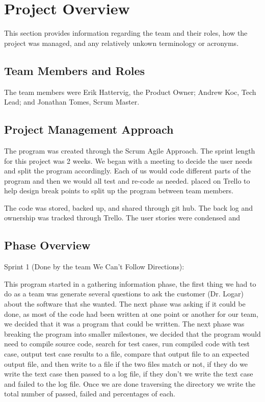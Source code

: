 

\chapter{Project Overview}
This section provides information regarding the team and their roles,
how the project was managed, and any relatively unkown terminology or
acronyms.



\section{Team Members and Roles}
The team members were Erik Hattervig, the Product Owner; Andrew Koc, Tech Lead;
and Jonathan Tomes, Scrum Master.


\section{Project  Management Approach}

	The program was created through the Scrum Agile Approach.
The sprint length for this project was 2 weeks. We began with a meeting to
decide the user needs and split the program accordingly. Each of us would code
different parts of the program and then we would all test and re-code as needed.
placed on Trello to help design break points to split up the program between team members. 

	The code was stored, backed up, and shared through git hub. The back log and ownership 
was tracked through Trello. The user stories were condensed and 



\section{Phase  Overview}
Sprint 1 (Done by the team We Can't Follow Directions):

This program started in a gathering information phase, the first thing we had to do as a team 
was generate several questions to ask the customer (Dr. Logar) about the software that she 
wanted.   The next phase was asking if it could be done, as most of the code had been written 
at one point or another for our team, we decided that it was a program that could be written.  
The next phase was breaking the program into smaller milestones, we decided that the program 
would need to compile source code, search for test cases, run compiled code with test case, 
output test case results to a file, compare that output file to an expected output file, and then 
write to a file if the two files match or not, if they do we write the text case then passed to a log 
file, if they don't we write the text case and failed to the log file.   Once we are done traversing the 
directory we write the total number of passed, failed and percentages of each.

